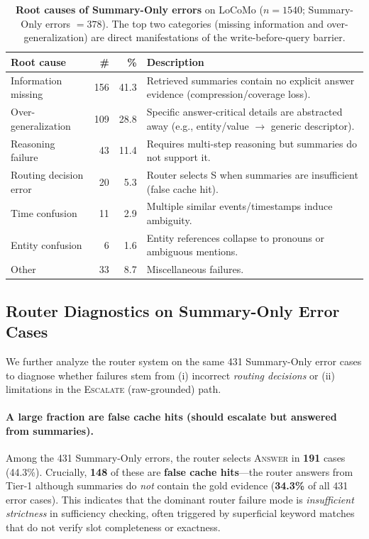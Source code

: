 \documentclass{article}
\theoremstyle{plain}
\theoremstyle{definition}
\theoremstyle{remark}
\begin{document}
\begin{table}[t]
\centering
\small
\setlength{\tabcolsep}{10pt}
\caption{\textbf{Root causes of Summary-Only errors} on LoCoMo ($n{=}1540$; Summary-Only errors $=378$).
The top two categories (missing information and over-generalization) are direct manifestations of the write-before-query barrier.}
\label{tab:summary_only_root_causes}
\begin{tabular}{lrrp{}}
\toprule
\textbf{Root cause} & \textbf{\#} & \textbf{\%} & \textbf{Description} \\
\midrule
Information missing & 156 & 41.3 & Retrieved summaries contain no explicit answer evidence (compression/coverage loss). \\
Over-generalization & 109 & 28.8 & Specific answer-critical details are abstracted away (e.g., entity/value $\rightarrow$ generic descriptor). \\
Reasoning failure & 43 & 11.4 & Requires multi-step reasoning but summaries do not support it. \\
Routing decision error & 20 & 5.3 & Router selects S when summaries are insufficient (false cache hit). \\
Time confusion & 11 & 2.9 & Multiple similar events/timestamps induce ambiguity. \\
Entity confusion & 6 & 1.6 & Entity references collapse to pronouns or ambiguous mentions. \\
Other & 33 & 8.7 & Miscellaneous failures. \\
\bottomrule
\end{tabular}
\end{table}


\subsection{Router Diagnostics on Summary-Only Error Cases}
\label{subsec:router_diagnostics_on_error_cases}

We further analyze the router system on the same 431 Summary-Only error cases to diagnose whether failures stem from (i) incorrect \emph{routing decisions} or (ii) limitations in the \textsc{Escalate} (raw-grounded) path.

\paragraph{A large fraction are false cache hits (should escalate but answered from summaries).}
Among the 431 Summary-Only errors, the router selects \textsc{Answer} in \textbf{191} cases (44.3\%).
Crucially, \textbf{148} of these are \textbf{false cache hits}---the router answers from Tier-1 although summaries do \emph{not} contain the gold evidence (\textbf{34.3\%} of all 431 error cases).
This indicates that the dominant router failure mode is \emph{insufficient strictness} in sufficiency checking, often triggered by superficial keyword matches that do not verify slot completeness or exactness.
\end{document}
